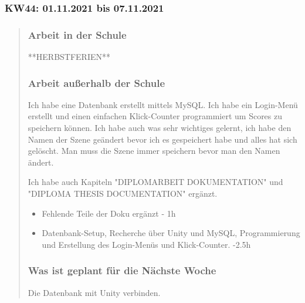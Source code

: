 \subsubsection{KW44: 01.11.2021 bis 07.11.2021}
\begin{quote}
	\subsubsection*{Arbeit in der Schule}
	**HERBSTFERIEN** 
	
	\subsubsection*{Arbeit außerhalb der Schule}
	Ich habe eine Datenbank erstellt mittels MySQL.
	Ich habe ein Login-Menü erstellt und einen einfachen Klick-Counter programmiert um Scores zu speichern können.
	Ich habe auch was sehr wichtiges gelernt, ich habe den Namen der Szene geändert bevor ich es gespeichert habe und alles hat sich gelöscht. Man muss die Szene immer speichern bevor man den Namen ändert.
	
	Ich habe auch Kapiteln "DIPLOMARBEIT DOKUMENTATION" und "DIPLOMA THESIS DOCUMENTATION" ergänzt.
	
	\begin{itemize}
		\item Fehlende Teile der Doku ergänzt - 1h
		\item Datenbank-Setup, Recherche über Unity und MySQL, Programmierung und Erstellung des Login-Menüs und Klick-Counter. -2.5h
	\end{itemize}
	
	\subsubsection*{Was ist geplant für die Nächste Woche}
	Die Datenbank mit Unity verbinden.
\end{quote}